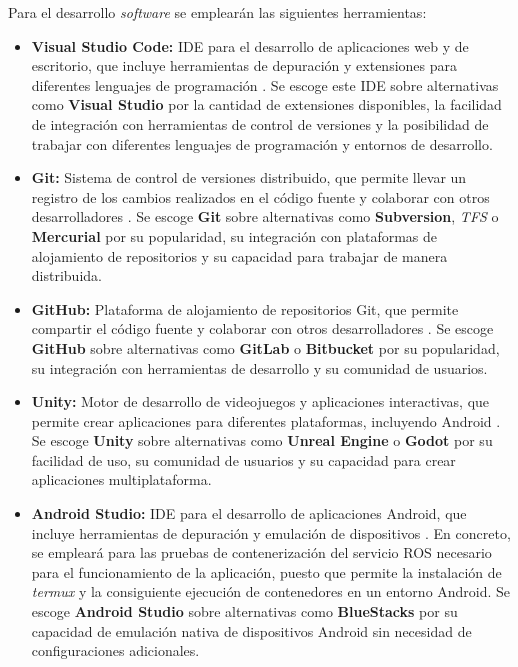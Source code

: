 Para el desarrollo \textit{software} se emplearán las siguientes herramientas:
\begin{itemize}
    \item \textbf{Visual Studio Code:} IDE para el desarrollo de aplicaciones web y de escritorio, que incluye herramientas de depuración y extensiones para diferentes lenguajes de programación \parencite{visualstudioVisualStudio}.
    Se escoge este IDE sobre alternativas como \textbf{Visual Studio} por la cantidad de extensiones disponibles, la facilidad de integración con herramientas de control de versiones y la posibilidad de trabajar con diferentes lenguajes de programación y entornos de desarrollo.
    \item \textbf{Git:} Sistema de control de versiones distribuido, que
    permite llevar un registro de los cambios realizados en el código fuente y colaborar con otros desarrolladores \parencite{gitscm}.
    Se escoge \textbf{Git} sobre alternativas como \textbf{Subversion}, \textit{TFS} o \textbf{Mercurial} por su popularidad, su integración con plataformas de alojamiento de repositorios y su capacidad para trabajar de manera distribuida.
    \item \textbf{GitHub:} Plataforma de alojamiento de repositorios Git, que permite compartir el código fuente y colaborar con otros desarrolladores \parencite{githubWhatGitHub}.
    Se escoge \textbf{GitHub} sobre alternativas como \textbf{GitLab} o \textbf{Bitbucket} por su popularidad, su integración con herramientas de desarrollo y su comunidad de usuarios.
    \item \textbf{Unity:} Motor de desarrollo de videojuegos y aplicaciones interactivas, que permite crear aplicaciones para diferentes plataformas, incluyendo Android \parencite{unityUnityDevelop}.
    Se escoge \textbf{Unity} sobre alternativas como \textbf{Unreal Engine} o \textbf{Godot} por su facilidad de uso, su comunidad de usuarios y su capacidad para crear aplicaciones multiplataforma.
    \item \textbf{Android Studio:} IDE para el desarrollo de aplicaciones Android, que incluye herramientas de depuración y emulación de dispositivos \parencite{androidDownloadAndroid}. 
    En concreto, se empleará para las pruebas de contenerización del servicio ROS necesario para el funcionamiento de la aplicación, puesto que permite 
    la instalación de \textit{termux} y la consiguiente ejecución de contenedores en un entorno Android. 
    Se escoge \textbf{Android Studio} sobre alternativas como \textbf{BlueStacks} por su capacidad de emulación nativa de dispositivos Android sin necesidad de configuraciones adicionales.

\end{itemize}
